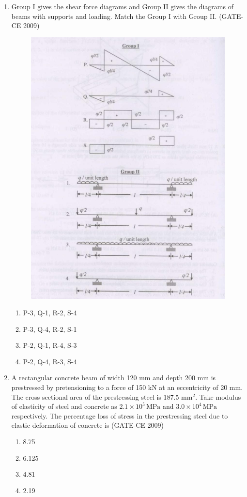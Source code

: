 \documentclass[journal,12pt,onecolumn]{article}
\theoremstyle{remark}
\begin{document}
\begin{enumerate}
    \item Group I gives the shear force diagrams and Group II gives the diagrams of beams with supports and loading. Match the Group I with Group II. (GATE-CE 2009)

    \begin{figure}[H]
        \centering
        \includegraphics[width=0.7\columnwidth]{figs/image3.jpg}
        \label{fig:placeholder}
    \end{figure}
    
    \begin{enumerate}
        \item P-3, Q-1, R-2, S-4 
        \item P-3, Q-4, R-2, S-1 
        \item P-2, Q-1, R-4, S-3 
        \item P-2, Q-4, R-3, S-4
    \end{enumerate}
    
    \item A rectangular concrete beam of width 120 mm and depth 200 mm is prestressed by pretensioning to a force of 150 kN at an eccentricity of 20 mm. The cross sectional area of the prestressing steel is 187.5 mm$^2$. Take modulus of elasticity of steel and concrete as $2.1 \times 10^5\, \text{MPa}$ and $3.0 \times 10^4\, \text{MPa}$ respectively. The percentage loss of stress in the prestressing steel due to elastic deformation of concrete is (GATE-CE 2009)
    \begin{enumerate}
        \item 8.75 
        \item 6.125 
        \item 4.81 
        \item 2.19
    \end{enumerate}
    

\end{enumerate}
\end{document}
